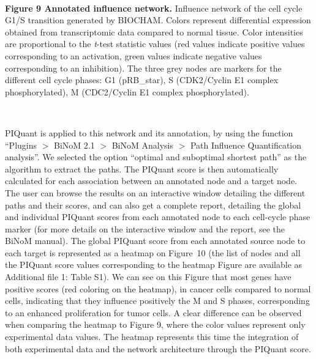 \documentclass[11pt]{bmc_article_s50}
\newenvironment{bmcformat}{\begin{raggedright}\baselineskip20pt\sloppy\setboolean{publ}{false}}{\end{raggedright}\baselineskip20pt\sloppy}
\begin{document}
\begin{bmcformat}
\hrulefill\

\vspace*{-15pt}
\textbf{Figure 9 Annotated influence network.}
Influence network of the cell cycle G1/S transition generated by BIOCHAM. Colors represent differential
expression obtained from transcriptomic data compared to normal tissue. Color
intensities are proportional to the \textit{t}-test statistic values (red values indicate
positive values corresponding to an activation, green values indicate negative
values corresponding to an inhibition). The three grey nodes are markers for the
different cell cycle phases: G1 (pRB\_star), S (CDK2/Cyclin E1 complex phosphorylated), M (CDC2/Cyclin E1 complex phosphorylated).

\vspace*{-21pt}

\hrulefill\


PIQuant is applied to this network and its annotation, by using the function
``Plugins $>$ BiNoM 2.1 $>$ BiNoM Analysis $>$ Path Influence Quantification
analysis''. We selected the option ``optimal and
suboptimal shortest path'' as the algorithm to extract the paths. The PIQuant
score is then automatically calculated for each association
between an annotated node and a target node. The user can browse the results on an
interactive window detailing the different paths and their scores, and can also
get a complete report, detailing the global and individual PIQuant scores from
each annotated node to each cell-cycle phase marker (for more details on
the interactive window and the report, see the BiNoM manual).
The global PIQuant score from each annotated source node to each target is
represented as a heatmap on Figure~10 (the list of nodes and all the PIQuant
score values corresponding to the heatmap Figure are available as Additional file 1: Table S1). We can see on this Figure that most
genes have positive scores (red coloring on the heatmap), in cancer cells compared to normal cells, indicating that they influence positively the M and
S phases, corresponding to an enhanced proliferation for tumor cells.
A clear difference can be observed when comparing the heatmap to Figure 9, where
the color values represent only experimental data values. The heatmap represents
this time the integration of both experimental data and the network
architecture through the PIQuant score.{\pagebreak} 


\end{bmcformat}
\end{document}
